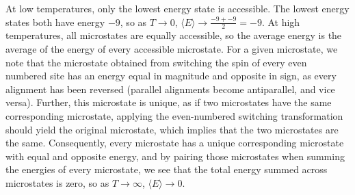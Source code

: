 \documentclass{article}
\begin{document}
At low temperatures, only the lowest energy state is accessible. The lowest energy states both have energy $-9$, so as $T \to 0$, $\langle E \rangle \to \frac{-9 + -9}{2} = -9$. At high temperatures, all microstates are equally accessible, so the average energy is the average of the energy of every accessible microstate. For a given microstate, we note that the microstate obtained from switching the spin of every even numbered site has an energy equal in magnitude and opposite in sign, as every alignment has been reversed (parallel alignments become antiparallel, and vice versa). Further, this microstate is unique, as if two microstates have the same corresponding microstate, applying the even-numbered switching transformation should yield the original microstate, which implies that the two microstates are the same. Consequently, every microstate has a unique corresponding microstate with equal and opposite energy, and by pairing those microstates when summing the energies of every microstate, we see that the total energy summed across microstates is zero, so as $T \to \infty$, $\langle E \rangle \to 0$. 
\end{document}
